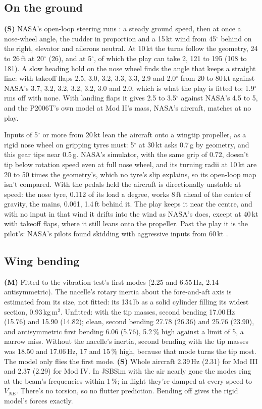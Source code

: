 \documentclass[10pt,a4paper,twocolumn]{article}
\begin{document}
\subsection{On the ground}\label{sec:ground}
\textbf{(S)} NASA's open-loop steering runs \cite{gd}: a steady ground speed, then at once a nose-wheel angle, the rudder in proportion and a 15\,kt wind from 45$^\circ$ behind on the right, elevator and ailerons neutral. At 10\,kt the turns follow the geometry, 24 to 26\,ft at 20$^\circ$ (26), and at 5$^\circ$, of which the play can take 2, 121 to 195 (108 to 181). A slow heading hold on the nose wheel finds the angle that keeps a straight line: with takeoff flaps 2.5, 3.0, 3.2, 3.3, 3.3, 2.9 and 2.0$^\circ$ from 20 to 80\,kt against NASA's 3.7, 3.2, 3.2, 3.2, 3.2, 3.0 and 2.0, which is what the play is fitted to; 1.9$^\circ$ rms off with none. With landing flaps it gives 2.5 to 3.5$^\circ$ against NASA's 4.5 to 5, and the P2006T's own model at Mod II's mass, NASA's aircraft, matches at no play.

Inputs of 5$^\circ$ or more from 20\,kt lean the aircraft onto a wingtip propeller, as a rigid nose wheel on gripping tyres must: 5$^\circ$ at 30\,kt asks 0.7\,g by geometry, and this gear tips near 0.5\,g. NASA's simulator, with the same grip of 0.72, doesn't tip below rotation speed even at full nose wheel, and its turning radii at 10\,kt are 20 to 50 times the geometry's, which no tyre's slip explains, so its open-loop map isn't compared. With the pedals held the aircraft is directionally unstable at speed: the nose tyre, 0.112 of its load a degree, works 8\,ft ahead of the centre of gravity, the mains, 0.061, 1.4\,ft behind it. The play keeps it near the centre, and with no input in that wind it drifts into the wind as NASA's does, except at 40\,kt with takeoff flaps, where it still leans onto the propeller. Past the play it is the pilot's: NASA's pilots found skidding with aggressive inputs from 60\,kt \cite{gd}.

\subsection{Wing bending}
\textbf{(M)} Fitted to the vibration test's first modes (2.25 and 6.55\,Hz, 2.14 antisymmetric). The nacelle's rotary inertia about the fore-and-aft axis is estimated from its size, not fitted: its 134\,lb as a solid cylinder filling its widest section, 0.93\,kg\,m$^2$. Unfitted: with the tip masses, second bending 17.00\,Hz (15.76) and 15.90 (14.82); clean, second bending 27.78 (26.36) and 25.76 (23.90), and antisymmetric first bending 6.06 (5.76), 5.2\,\% high against a limit of 5, a narrow miss. Without the nacelle's inertia, second bending with the tip masses was 18.50 and 17.06\,Hz, 17 and 15\,\% high, because that mode turns the tip most. The model only flies the first mode. \textbf{(S)} Whole aircraft 2.39\,Hz (2.31) for Mod III and 2.37 (2.29) for Mod IV. In JSBSim with the air nearly gone the modes ring at the beam's frequencies within 1\,\%; in flight they're damped at every speed to $V_{NE}$. There's no torsion, so no flutter prediction. Bending off gives the rigid model's forces exactly.
\end{document}
